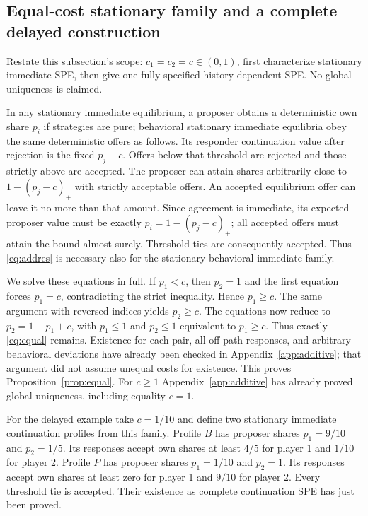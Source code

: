 \documentclass[11pt]{article}
\newcommand{\pos}[1]{\left(#1\right)_{+}}
\begin{document}
\subsection{Equal-cost stationary family and a complete delayed construction}\label{app:equal}
Restate this subsection's scope: $c_1=c_2=c\in(0,1)$, first characterize stationary immediate SPE, then give one fully specified history-dependent SPE. No global uniqueness is claimed.

In any stationary immediate equilibrium, a proposer obtains a deterministic own share $p_i$ if strategies are pure; behavioral stationary immediate equilibria obey the same deterministic offers as follows. Its responder continuation value after rejection is the fixed $p_j-c$. Offers below that threshold are rejected and those strictly above are accepted. The proposer can attain shares arbitrarily close to $1-\pos{p_j-c}$ with strictly acceptable offers. An accepted equilibrium offer can leave it no more than that amount. Since agreement is immediate, its expected proposer value must be exactly $p_i=1-\pos{p_j-c}$; all accepted offers must attain the bound almost surely. Threshold ties are consequently accepted. Thus \eqref{eq:addres} is necessary also for the stationary behavioral immediate family.

We solve these equations in full. If $p_1<c$, then $p_2=1$ and the first equation forces $p_1=c$, contradicting the strict inequality. Hence $p_1\ge c$. The same argument with reversed indices yields $p_2\ge c$. The equations now reduce to $p_2=1-p_1+c$, with $p_1\le1$ and $p_2\le1$ equivalent to $p_1\ge c$. Thus exactly \eqref{eq:equal} remains. Existence for each pair, all off-path responses, and arbitrary behavioral deviations have already been checked in Appendix~\ref{app:additive}; that argument did not assume unequal costs for existence. This proves Proposition~\ref{prop:equal}. For $c\ge1$ Appendix~\ref{app:additive} has already proved global uniqueness, including equality $c=1$.

For the delayed example take $c=1/10$ and define two stationary immediate continuation profiles from this family. Profile $B$ has proposer shares $p_1=9/10$ and $p_2=1/5$. Its responses accept own shares at least $4/5$ for player 1 and $1/10$ for player 2. Profile $P$ has proposer shares $p_1=1/10$ and $p_2=1$. Its responses accept own shares at least zero for player 1 and $9/10$ for player 2. Every threshold tie is accepted. Their existence as complete continuation SPE has just been proved.
\end{document}
